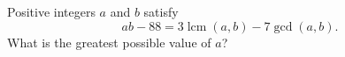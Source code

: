 Positive integers $a$ and $b$ satisfy
\[ab-88=3\operatorname{lcm}(a,b)-7\gcd(a,b).\]
What is the greatest possible value of $a$?
